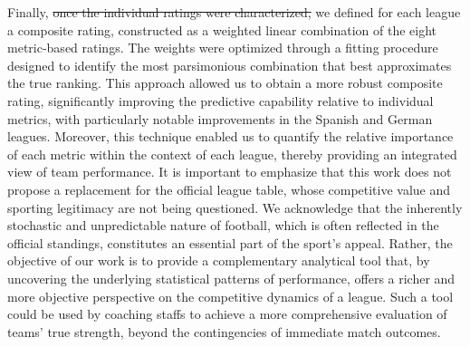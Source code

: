 \documentclass[preprint,12pt]{elsarticle}
\newcommand{\agregar}[1]{{\color{blue}{#1}}}
\newcommand{\sacar}[1]{{\color{red}\sout{#1}}}
\begin{document}
%
\agregar{
We also extended our topological analysis to evaluate the consistency of the inferred rankings. By quantifying the ratio between the solenoidal and total flow energies ($I$), we empirically confirmed that the emergence of local cyclic dynamics systematically limits the gradient component's capacity to reconstruct the macro-ordering of the competition, as evidenced by a moderate negative correlation ($r = -0.46$) with the official standings. Crucially, our findings reveal that inconsistency is not a homogeneous artifact of the model, but rather a structural feature that characterizes the "competition style" of each league. The proposed framework successfully mapped these ecosystems into distinct regimes, distinguishing between highly hierarchical structures (such as the English and Italian leagues), homogeneous tactical parity defined by generalized loops (the German league), and pockets of localized chaos (the French and Spanish leagues). These results position the quantification of local and global inconsistencies as a robust diagnostic tool for sports analytics.
}
%
Finally, \sacar{once the individual ratings were characterized,} we defined for each league a composite rating, constructed as a weighted linear combination of the eight metric-based ratings. The weights were optimized through a fitting procedure designed to identify the most parsimonious combination that best approximates the true ranking. This approach allowed us to obtain a more robust composite rating, significantly improving the predictive capability relative to individual metrics, with particularly notable improvements in the Spanish and German leagues. Moreover, this technique enabled us to quantify the relative importance of each metric within the context of each league, thereby providing an integrated view of team performance.
%
It is important to emphasize that this work does not propose a replacement for the official league table, whose competitive value and sporting legitimacy are not being questioned. We acknowledge that the inherently stochastic and unpredictable nature of football, which is often reflected in the official standings, constitutes an essential part of the sport’s appeal. Rather, the objective of our work is to provide a complementary analytical tool that, by uncovering the underlying statistical patterns of performance, offers a richer and more objective perspective on the competitive dynamics of a league. Such a tool could be used by coaching staffs to achieve a more comprehensive evaluation of teams’ true strength, beyond the contingencies of immediate match outcomes.
\end{document}
